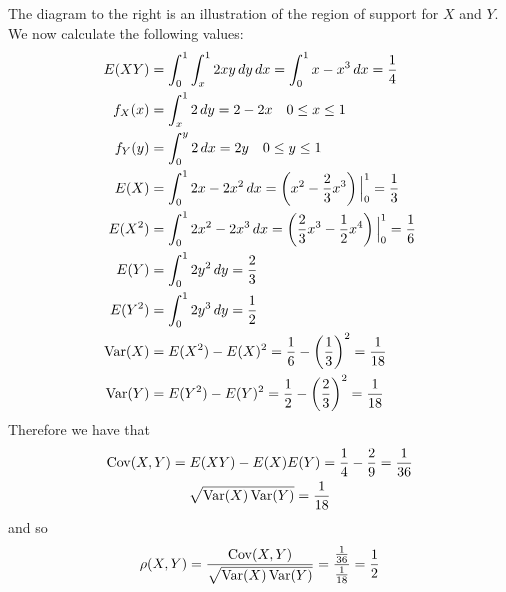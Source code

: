 \documentclass[notoc,notitlepage]{tufte-book}
\begin{document}
\begin{solution}
    The diagram to the right is an illustration of the region of support for $X$ and $Y$.
    We now calculate the following values:
    \begin{align*}
      E(XY)  &= \int_{0}^{1} \int_{x}^{1} 2xy \dif{y} \dif{x} = \int_{0}^{1} x - x^3 \dif{x} = \frac{1}{4} \\
      f_X(x) &= \int_{x}^{1} 2 \dif{y} = 2 - 2x \quad 0 \leq x \leq 1 \\
      f_Y(y) &= \int_{0}^{y} 2 \dif{x} = 2y \quad 0 \leq y \leq 1 \\
      E(X)   &= \int_{0}^{1} 2x - 2x^2 \dif{x} = \left( x^2 - \frac{2}{3}x^3 \right)\at{0}{1} = \frac{1}{3} \\
      E(X^2) &= \int_{0}^{1} 2x^2 - 2x^3 \dif{x} = \left( \frac{2}{3}x^3 - \frac{1}{2}x^4 \right)\at{0}{1} = \frac{1}{6} \\
      E(Y)   &= \int_{0}^{1} 2y^2 \dif{y} = \frac{2}{3} \\
      E(Y^2) &= \int_{0}^{1} 2y^3 \dif{y} = \frac{1}{2} \\
      \Var(X)&= E(X^2) - E(X)^2 = \frac{1}{6} - \left( \frac{1}{3} \right)^2 = \frac{1}{18} \\
      \Var(Y)&= E(Y^2) - E(Y)^2 = \frac{1}{2} - \left( \frac{2}{3} \right)^2 = \frac{1}{18}
    \end{align*}
    Therefore we have that
    \begin{gather*}
      \operatorname{Cov}(X, Y) = E(XY) - E(X)E(Y) = \frac{1}{4} - \frac{2}{9} = \frac{1}{36} \\
      \sqrt{\operatorname{Var}(X) \operatorname{Var}(Y)} = \frac{1}{18}
    \end{gather*}
    and so
    \begin{equation*}
      \rho(X, Y) = \frac{\operatorname{Cov}(X, Y)}{\sqrt{\operatorname{Var}(X) \operatorname{Var}(Y)}} = \frac{\frac{1}{36}}{\frac{1}{18}} = \frac{1}{2}
    \end{equation*}
\end{solution}
\end{document}
